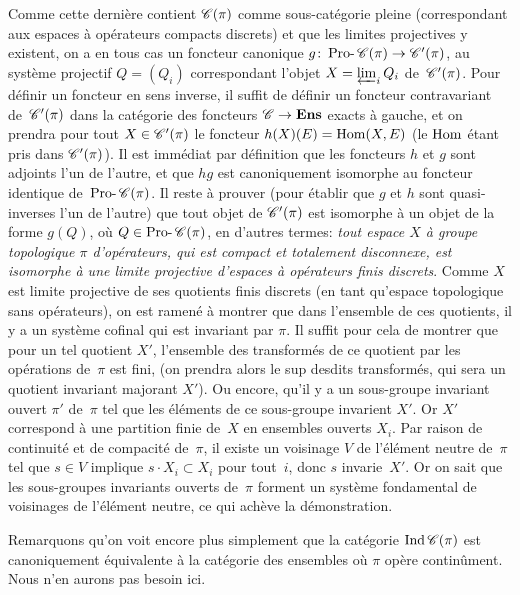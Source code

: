 Comme cette derni\`ere contient $\cal{C}(\pi)$ comme
sous-cat\'egorie pleine (correspondant aux espaces \`a
op\'erateurs compacts discrets) et que les limites projectives y
existent, on a en tous cas un foncteur canonique $g\colon
\Prodash\cal{C}(\pi) \to \cal{C}'(\pi)$, au syst\`eme projectif
$Q=(Q_i)$ correspondant
l'objet $X=\varprojlim_{i} Q_i$ de~$\cal{C}'(\pi)$. Pour d\'efinir
un foncteur en sens inverse, il suffit de d\'efinir un foncteur
contravariant de~$\cal{C}'(\pi)$ dans la cat\'egorie des foncteurs
$\cal{C}\to \Ens$ exacts \`a gauche, et on prendra pour tout
$X\in\cal{C}'(\pi)$ le foncteur $h(X)(E)= \operatorname{Hom}(X, E)$
(le $\operatorname{Hom}$ \'etant pris dans $\cal{C}'(\pi)$). Il est imm\'ediat
par d\'efinition que les foncteurs $h$ et $g$ sont adjoints l'un de
l'autre, et que $hg$ est canoniquement isomorphe au foncteur identique
de~$\Prodash\cal{C}(\pi)$. Il reste \`a prouver (pour \'etablir
que $g$ et $h$ sont quasi-inverses l'un de l'autre) que tout objet de
$\cal{C}'(\pi)$ est isomorphe \`a un objet de la forme $g(Q)$,
o\`u $Q\in\Prodash{\cal C}(\pi)$, en d'autres termes: \emph{tout
espace $X$ à groupe topologique $\pi$ d'opérateurs, qui est
compact et totalement disconnexe, est isomorphe à une limite
projective d'espaces à opérateurs finis discrets}. Comme $X$
est limite projective de ses quotients finis discrets (en tant
qu'espace topologique sans op\'erateurs), on est ramen\'e \`a
montrer que dans l'ensemble de ces quotients, il y a un syst\`eme
cofinal qui est invariant par $\pi$. Il suffit pour cela de montrer
que pour un tel quotient $X'$, l'ensemble des transform\'es de ce
quotient par les op\'erations de~$\pi$ est fini, (on prendra alors
le sup desdits transform\'es, qui sera un quotient invariant
majorant $X'$). Ou encore, qu'il y a un sous-groupe invariant ouvert
$\pi'$ de~$\pi$ tel que les \'el\'ements de ce sous-groupe
invarient $X'$. Or $X'$ correspond \`a une partition finie de~$X$ en
ensembles ouverts $X_i$. Par raison de continuit\'e et de
compacit\'e de~$\pi$, il existe un voisinage $V$ de
l'\'el\'ement neutre de~$\pi$ tel que $s\in V$ implique
$s\cdot X_i\subset X_i$ pour tout~$i$, donc $s$ invarie~$X'$. Or on sait
que les sous-groupes invariants ouverts de~$\pi$ forment un
syst\`eme fondamental de voisinages de l'\'el\'ement neutre, ce
qui ach\`eve la d\'emonstration.

Remarquons qu'on voit encore plus simplement que la cat\'egorie
$\Ind \cal{C}(\pi)$ est canoniquement \'equivalente \`a la
cat\'egorie des ensembles o\`u $\pi$ op\`ere
contin\^ument. Nous n'en aurons pas besoin ici.

